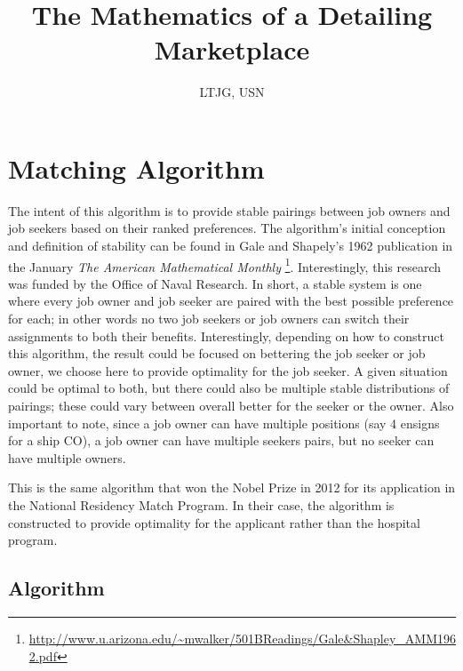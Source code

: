 \documentclass{article}
\title{The Mathematics of a Detailing Marketplace}
\author{\studentname \qquad LTJG, USN}
\begin{document}
\maketitle

\section{Matching Algorithm}

The intent of this algorithm is to provide stable pairings between job owners and job seekers based on their ranked preferences. The algorithm's initial conception and definition of stability can be found in Gale and Shapely's 1962 publication in the January \textit{The American Mathematical Monthly} \footnote{\url{http://www.u.arizona.edu/~mwalker/501BReadings/Gale&Shapley_AMM1962.pdf}}. Interestingly, this research was funded by the Office of Naval Research. In short, a stable system is one where every job owner and job seeker are paired with the best possible preference for each; in other words no two job seekers or job owners can switch their assignments to both their benefits. Interestingly, depending on how to construct this algorithm, the result could be focused on bettering the job seeker or job owner, we choose here to provide optimality for the job seeker. A given situation could be optimal to both, but there could also be multiple stable distributions of pairings; these could vary between overall better for the seeker or the owner. Also important to note, since a job owner can have multiple positions (say 4 ensigns for a ship CO), a job owner can have multiple seekers pairs, but no seeker can have multiple owners.

This is the same algorithm that won the Nobel Prize in 2012 for its application in the National Residency Match Program. In their case, the algorithm is constructed to provide optimality for the applicant rather than the hospital program.

\subsection{Algorithm}
\end{document}
